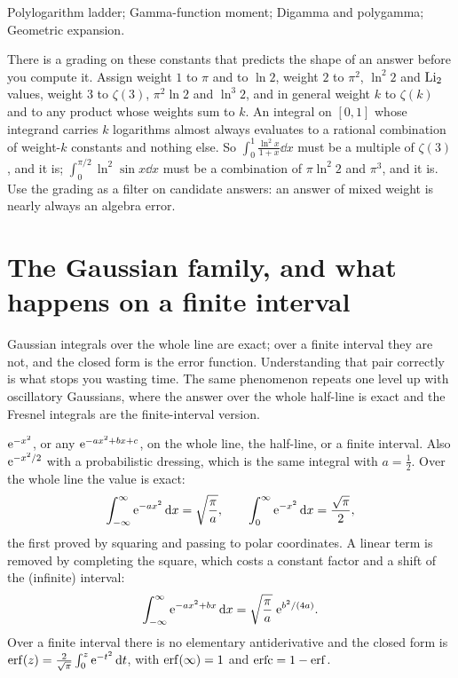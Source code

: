 \begin{seealsob}Polylogarithm ladder; Gamma-function moment; Digamma and polygamma; Geometric expansion.\end{seealsob}

\begin{keynote}
There is a grading on these constants that predicts the shape of an answer before you compute it. Assign weight $1$ to $\pi$ and to $\ln2$, weight $2$ to $\pi^{2}$, $\ln^{2}2$ and $\operatorname{Li}_2$ values, weight $3$ to $\zeta(3)$, $\pi^{2}\ln2$ and $\ln^{3}2$, and in general weight $k$ to $\zeta(k)$ and to any product whose weights sum to $k$. An integral on $[0,1]$ whose integrand carries $k$ logarithms almost always evaluates to a rational combination of weight-$k$ constants and nothing else. So $\int_0^1\frac{\ln^{2}x}{1+x}\dd x$ must be a multiple of $\zeta(3)$, and it is; $\int_0^{\pi/2}\ln^{2}\sin x\dd x$ must be a combination of $\pi\ln^{2}2$ and $\pi^{3}$, and it is. Use the grading as a filter on candidate answers: an answer of mixed weight is nearly always an algebra error.
\end{keynote}

\section{The Gaussian family, and what happens on a finite interval}

Gaussian integrals over the whole line are exact; over a finite interval they are not, and the closed form is the error function. Understanding that pair correctly is what stops you wasting time. The same phenomenon repeats one level up with oscillatory Gaussians, where the answer over the whole half-line is exact and the Fresnel integrals are the finite-interval version.

\cue $\mathrm{e}^{-x^{2}}$, or any $\mathrm{e}^{-ax^{2}+bx+c}$, on the whole line, the half-line, or a finite interval. Also $\mathrm{e}^{-x^{2}/2}$ with a probabilistic dressing, which is the same integral with $a=\tfrac12$.
\method Over the whole line the value is exact:
\[\int_{-\infty}^{\infty}\mathrm{e}^{-ax^{2}}\,\mathrm{d} x=\sqrt{\frac{\pi}{a}},\qquad \int_0^{\infty}\mathrm{e}^{-x^{2}}\,\mathrm{d} x=\frac{\sqrt\pi}{2},\]
the first proved by squaring and passing to polar coordinates. A linear term is removed by completing the square, which costs a constant factor and a shift of the (infinite) interval:
\[\int_{-\infty}^{\infty}\mathrm{e}^{-ax^{2}+bx}\,\mathrm{d} x=\sqrt{\frac{\pi}{a}}\;\mathrm{e}^{b^{2}/(4a)}.\]
Over a finite interval there is no elementary antiderivative and the closed form is $\operatorname{erf}(z)=\tfrac{2}{\sqrt\pi}\int_0^{z}\mathrm{e}^{-t^{2}}\,\mathrm{d} t$, with $\operatorname{erf}(\infty)=1$ and $\operatorname{erfc}=1-\operatorname{erf}$.

